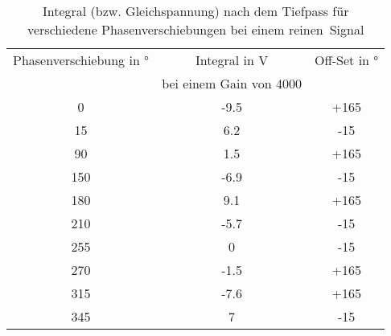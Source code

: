 \begin{table}[h!]
\begin{center}
\begin{tabular}{c | c | c}
	Phasenverschiebung in \si{\degree} & Integral in \si{\volt} & Off-Set in \si{\degree} \\
	 & bei einem Gain von 4000 & \\
	\hline
	0   & -9.5 & +165 \\
	15  & 6.2 & -15 \\
	90  & 1.5 & +165 \\
	150 & -6.9 & -15 \\
	180 & 9.1 & +165 \\
	210 & -5.7 & -15 \\
	255 & 0 & -15 \\
	270 & -1.5 & +165 \\
	315 & -7.6 & +165 \\
	345 & 7 & -15
\end{tabular}
\caption{Integral (bzw. Gleichspannung) nach dem Tiefpass für verschiedene Phasenverschiebungen bei einem \glqq reinen\grqq\ Signal}
\label{Integral_ohne}
\end{center}
\end{table}